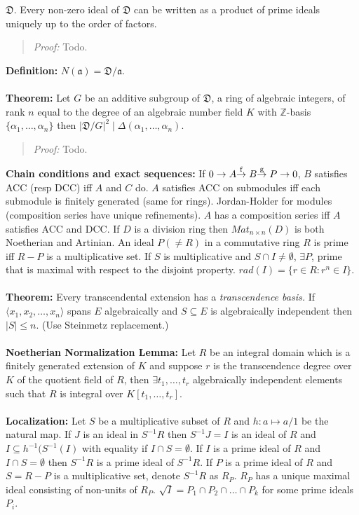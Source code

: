 ${\mathfrak D}$.  Every non-zero ideal of ${\mathfrak D}$ can be written as a product of prime
ideals uniquely up to the order of factors.
\begin{quote}
\emph{Proof:}  
Todo.
\end{quote}
{\bf Definition:}
$N({\mathfrak a})= {\mathfrak D}/ {\mathfrak a}$.
\\
\\
{\bf Theorem:}  Let $G$ be an additive subgroup of
${\mathfrak D}$, a ring of algebraic integers, of rank $n$ equal to the degree of an
algebraic number field $K$ with ${\mathbb Z}$-basis $\{ \alpha_1 , \ldots , \alpha_n \}$
then $|{\mathfrak D}/G|^2 \mid \Delta(\alpha_1, \ldots , \alpha_n)$.
\begin{quote}
\emph{Proof:}  
Todo.
\end{quote}
{\bf Chain conditions and exact sequences:}
If $0 \rightarrow A
{\buildrel\rm f\over \rightarrow} \; B {\buildrel\rm g\over \rightarrow} \; 
P \rightarrow 0$, $B$ satisfies ACC (resp DCC) iff $A$ and $C$ do.
$A$ satisfies ACC on submodules iff each submodule is finitely generated (same for
rings).  Jordan-Holder for modules (composition series have unique refinements).  $A$
has a composition series iff $A$ satisfies ACC and DCC.  If $D$ is a division ring
then $Mat_{n \times n}(D)$ is both Noetherian and Artinian.  An ideal $P (\ne R)$
in a commutative ring $R$ is prime iff $R-P$ is a multiplicative set.  If
$S$ is multiplicative and $S \cap I \ne \emptyset$, $\exists P$, prime that is maximal
with respect to the disjoint property.  $rad(I)= \{ r \in R: r^n \in I \}$.
\\
\\
{\bf Theorem:}
Every transcendental extension has a \emph{transcendence basis.}
If $\langle x_1, x_2, \ldots , x_n \rangle$
spans $E$ algebraically and $S \subseteq E$ is algebraically independent then
$|S| \le n$. (Use Steinmetz replacement.) 
\\
\\
{\bf Noetherian Normalization Lemma:}
Let $R$ be an integral domain which is a finitely generated extension of $K$ and
suppose $r$ is the transcendence degree over $K$ of the quotient field of $R$, then
$\exists t_1, \ldots, t_r$ algebraically independent elements such that
$R$ is integral over $K[t_1, \ldots, t_r]$.
\\
\\
{\bf Localization:} Let $S$ be a multiplicative subset of $R$ and $h: a \mapsto a/1$ 
be the natural map.  If $J$ is an ideal in $S^{-1}R$ then
$S^{-1}J = I$ is an ideal of $R$ and
$I \subseteq h^{-1}(S^{-1}(I)$ with equality if $I \cap S = \emptyset$.
If $I$ is a prime ideal of $R$ and $I \cap S= \emptyset$ then $S^{-1}R$ is a
prime ideal of $S^{-1}R$.  If $P$ is a prime ideal of $R$ and $S=R-P$ is a
multiplicative set, denote $S^{-1}R$ as $R_P$.  $R_P$ has a unique maximal ideal
consisting of non-units of $R_P$.  ${\sqrt I}= P_1 \cap P_2 \cap \ldots \cap P_k$ for
some prime ideals $P_i$.

